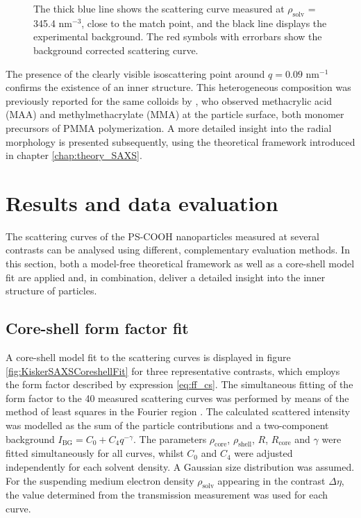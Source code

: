 \begin{figure}%
	\centering
		
		\caption[Background subtraction of the scattering curves of the PS-COOH particles.]{The thick blue line shows the scattering curve measured at $\rho_{\text{solv}}$ = 345.4 nm$^{-3}$, close to the match point, and the black line displays the experimental background. The red symbols with errorbars show the background corrected scattering curve.}
		\label{fig:KiskerBackgroundSubtraction}
\end{figure}

The presence of the clearly visible isoscattering point around \(q=0.09\) nm\(^{-1}\) confirms the existence of an inner structure. This heterogeneous composition was previously reported for the same colloids by \citet{minelli_characterization_2014}, who observed methacrylic acid (MAA) and methylmethacrylate (MMA) at the particle surface, both monomer precursors of PMMA polymerization. A more detailed insight into the radial morphology is presented subsequently, using the theoretical framework introduced in chapter \ref{chap:theory_SAXS}.

\section{Results and data evaluation}
\label{sec:KiskerResultsEvaluation}

The scattering curves of the PS-COOH nanoparticles measured at several contrasts can be analysed using different, complementary evaluation methods. In this section, both a model-free theoretical framework as well as a core-shell model fit are applied and, in combination, deliver a detailed insight into the inner structure of particles.


\subsection{Core-shell form factor fit}
\label{sec:coreshell_fit}
A core-shell model fit to the scattering curves is displayed in figure \ref{fig:KiskerSAXSCoreshellFit} for three representative contrasts, which employs the form factor described by expression \ref{eq:ff_cs}. The simultaneous fitting of the form factor to the 40 measured scattering curves was performed by means of the method of least squares in the Fourier region \citep{pedersen_analysis_1997}. The calculated scattered intensity was modelled as the sum of the particle contributions and a two-component background \(I_{\text{BG}}=C_0+C_4q^{-\gamma} \). The parameters \(\rho_{\text{core}}\), \(\rho_{\text{shell}}\), \(R\), \(R_{\text{core}}\) and \(\gamma\) were fitted simultaneously for all curves, whilst \( C_0 \) and \( C_4 \) were adjusted independently for each solvent density. A Gaussian size distribution was assumed. For the suspending medium electron density \( \rho_{\text{solv}} \) appearing in the contrast \( \Delta\eta \), the value determined from the transmission measurement was used for each curve.

